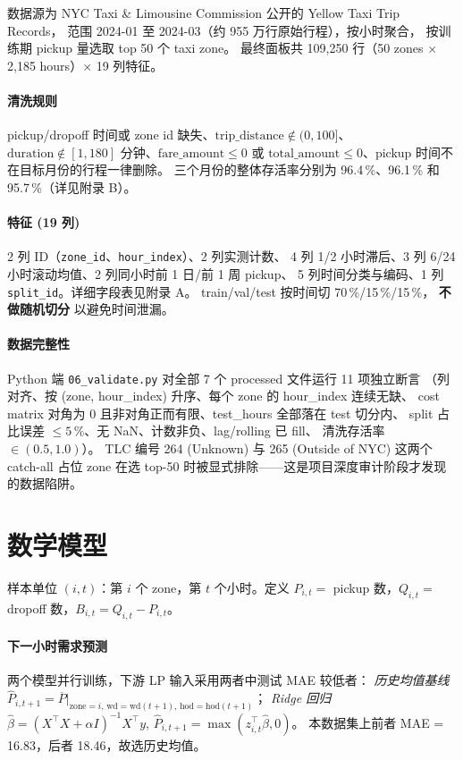 \documentclass[12pt,a4paper]{article}
\begin{document}
数据源为 NYC Taxi \& Limousine Commission 公开的 Yellow Taxi Trip Records，
范围 2024-01 至 2024-03（约 955 万行原始行程），按小时聚合，
按训练期 pickup 量选取 top 50 个 taxi zone。
最终面板共 109,250 行（50 zones × 2,185 hours）× 19 列特征。

\paragraph{清洗规则}
pickup/dropoff 时间或 zone id 缺失、$\text{trip\_distance}\notin (0,100]$、
$\text{duration}\notin [1,180]$ 分钟、$\text{fare\_amount}\le 0$ 或
$\text{total\_amount}\le 0$、pickup 时间不在目标月份的行程一律删除。
三个月份的整体存活率分别为 96.4\,\%、96.1\,\% 和 95.7\,\%（详见附录 B）。

\paragraph{特征 (19 列)}
2 列 ID（\verb|zone_id|、\verb|hour_index|）、2 列实测计数、
4 列 1/2 小时滞后、3 列 6/24 小时滚动均值、2 列同小时前 1 日/前 1 周 pickup、
5 列时间分类与编码、1 列 \verb|split_id|。详细字段表见附录 A。
train/val/test 按时间切 70\,\%/15\,\%/15\,\%，
\textbf{不做随机切分} 以避免时间泄漏。

\paragraph{数据完整性}
Python 端 \verb|06_validate.py| 对全部 7 个 processed 文件运行 11 项独立断言
（列对齐、按 (zone, hour\_index) 升序、每个 zone 的 hour\_index 连续无缺、
cost matrix 对角为 0 且非对角正而有限、test\_hours 全部落在 test 切分内、
split 占比误差 $\le 5\,\%$、无 NaN、计数非负、lag/rolling 已 fill、
清洗存活率 $\in (0.5, 1.0)$）。
TLC 编号 264 (Unknown) 与 265 (Outside of NYC) 这两个 catch-all 占位 zone
在选 top-50 时被显式排除——这是项目深度审计阶段才发现的数据陷阱。

\section{数学模型}\label{sec:model}
\vspace{-0.4em}

样本单位 $(i, t)$：第 $i$ 个 zone，第 $t$ 个小时。定义
$P_{i,t} = $ pickup 数，$Q_{i,t} = $ dropoff 数，$B_{i,t} = Q_{i,t} - P_{i,t}$。

\paragraph{下一小时需求预测}
两个模型并行训练，下游 LP 输入采用两者中测试 MAE 较低者：
\emph{历史均值基线} $\widehat P_{i,t+1}=\overline{P}\big|_{\text{zone}=i,\,
\text{wd}=\text{wd}(t+1),\,\text{hod}=\text{hod}(t+1)}$；
\emph{Ridge 回归} $\widehat\beta=(X^\top X+\alpha I)^{-1}X^\top y$,
$\widehat P_{i,t+1}=\max(z_{i,t}^\top \widehat\beta, 0)$。
本数据集上前者 MAE = 16.83，后者 18.46，故选历史均值。
\end{document}

